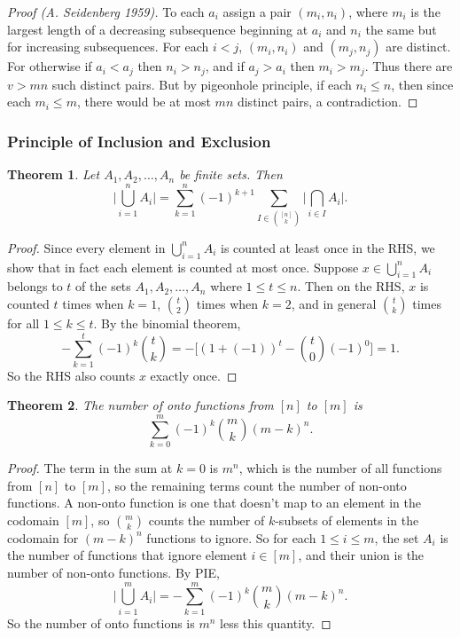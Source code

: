 \documentclass[12]{article}
\newtheorem{thm}{Theorem}[section] %
\theoremstyle{definition}
\begin{document}
	\begin{proof}[Proof (A. Seidenberg 1959)]
		To each $a_i$ assign a pair $(m_i,n_i)$, where $m_i$ is the largest length of a decreasing subsequence beginning at $a_i$ and $n_i$ the same but for increasing subsequences. For each $i < j$, $(m_i,n_i)$ and $(m_j,n_j)$ are distinct.  For otherwise if $a_i < a_j$ then $n_i > n_j$, and if $a_j > a_i$ then $m_i > m_j$.  Thus there are $v > mn$ such distinct pairs.  But by pigeonhole principle, if each $n_i \leq n$, then since each $m_i \leq m$, there would be at most $mn$ distinct pairs, a contradiction.
	\end{proof}
	
	\subsubsection{Principle of Inclusion and Exclusion}
	
	\begin{thm}
		Let $A_1, A_2, \ldots, A_n$ be finite sets.  Then
		$$\biggr|\bigcup_{i = 1}^n A_i \biggr| = \sum_{k=1}^n (-1)^{k+1} \sum_{I \in {[n] \choose k}} \biggr|\bigcap_{i \in I}A_i \biggr|.$$
	\end{thm}
	\begin{proof}
		Since every element in $\bigcup_{i = 1}^n A_i$ is counted at least once in the RHS, we show that in fact each element is counted at most once.  Suppose $x \in \bigcup_{i = 1}^n A_i$ belongs to $t$ of the sets $A_1, A_2, \ldots, A_n$ where $1 \leq t \leq n$.  Then on the RHS, $x$ is counted $t$ times when $k = 1$, ${t \choose 2}$ times when $k=2$, and in general ${t \choose k}$ times for all $1 \leq k \leq t$.  By the binomial theorem, 
		$$-\sum_{k = 1}^t (-1)^k {t \choose k} = -\biggr[(1 + (-1))^t - {t \choose 0}(-1)^0 \biggr] = 1.$$
		So the RHS also counts $x$ exactly once.
	\end{proof}

	\begin{thm}
		The number of onto functions from $[n]$ to $[m]$ is
		$$\sum_{k=0}^m (-1)^k {m \choose k}(m-k)^n.$$
	\end{thm}
	\begin{proof}
		The term in the sum at $k=0$ is $m^n$, which is the number of all functions from $[n]$ to $[m]$, so the remaining terms count the number of non-onto functions.  A non-onto function is one that doesn't map to an element in the codomain $[m]$, so ${m \choose k}$ counts the number of $k$-subsets of elements in the codomain for $(m-k)^n$ functions to ignore.  So for each $1 \leq i \leq m$, the set $A_i$ is the number of functions that ignore element $i \in [m]$, and their union is the number of non-onto functions. By PIE, 
		$$\biggr| \bigcup_{i=1}^m A_i| = -\sum_{k=1}^m (-1)^k {m \choose k}(m-k)^n.$$
		So the number of onto functions is $m^n$ less this quantity.
	\end{proof}
\end{document}
